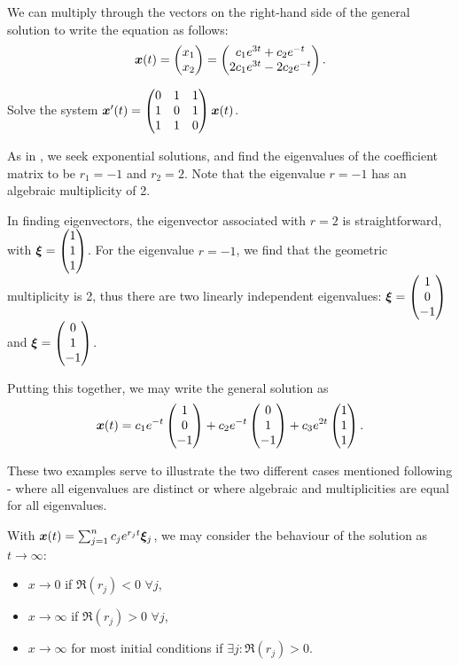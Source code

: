 \begin{remark}
	We can multiply through the vectors on the right-hand side of the general solution to write the equation as follows:
	\[
	\bm{x}(t) = \begin{pmatrix}x_1 \\ x_2\end{pmatrix} = \begin{pmatrix}c_1 e^{3t} + c_2 e^{-t} \\ 2c_1 e^{3t} - 2c_2 e^{-t}\end{pmatrix}.
	\]
\end{remark}

\begin{eg}
	Solve the system $\bm{x}'(t) = \begin{pmatrix}0 & 1 & 1 \\ 1 & 0 & 1 \\ 1 & 1 & 0\end{pmatrix} \bm{x}(t)$.
	
	As in , we seek exponential solutions, and find the eigenvalues of the coefficient matrix to be $r_1 = -1$ and $r_2 = 2$. Note that the eigenvalue $r=-1$ has an algebraic multiplicity of 2.
	
	In finding eigenvectors, the eigenvector associated with $r=2$ is straightforward, with $\bm{\xi} = \begin{pmatrix}1 \\ 1 \\ 1\end{pmatrix}$. For the eigenvalue $r=-1$, we find that the geometric multiplicity is 2, thus there are two linearly independent eigenvalues: $\bm{\xi} = \begin{pmatrix}1 \\ 0 \\ -1\end{pmatrix}$ and $\bm{\xi} = \begin{pmatrix}0 \\ 1 \\ -1\end{pmatrix}$.
	
	Putting this together, we may write the general solution as 
	\[
	\bm{x}(t) = c_1 e^{-t}\begin{pmatrix}1 \\ 0 \\ -1\end{pmatrix} + c_2 e^{-t} \begin{pmatrix}0 \\ 1 \\ -1\end{pmatrix} + c_3 e^{2t}\begin{pmatrix}1 \\ 1 \\ 1\end{pmatrix}.
	\]
\end{eg}

These two examples serve to illustrate the two different cases mentioned following  - where all eigenvalues are distinct or where algebraic and multiplicities are equal for all eigenvalues.

\begin{remark}
	With $\bm{x}(t) = \sum_{j=1}^n c_j e^{r_jt} \bm{\xi}_j$, we may consider the behaviour of the solution as $t \to \infty$:
	\begin{itemize}
		\item $x \to 0$ if $\Re(r_j) < 0 \,\, \forall j$,
		\item $x \to \infty$ if $\Re(r_j) > 0 \,\, \forall j$,
		\item $x \to \infty$ for most initial conditions if $\exists j: \Re(r_j) > 0$.
	\end{itemize}
\end{remark}


